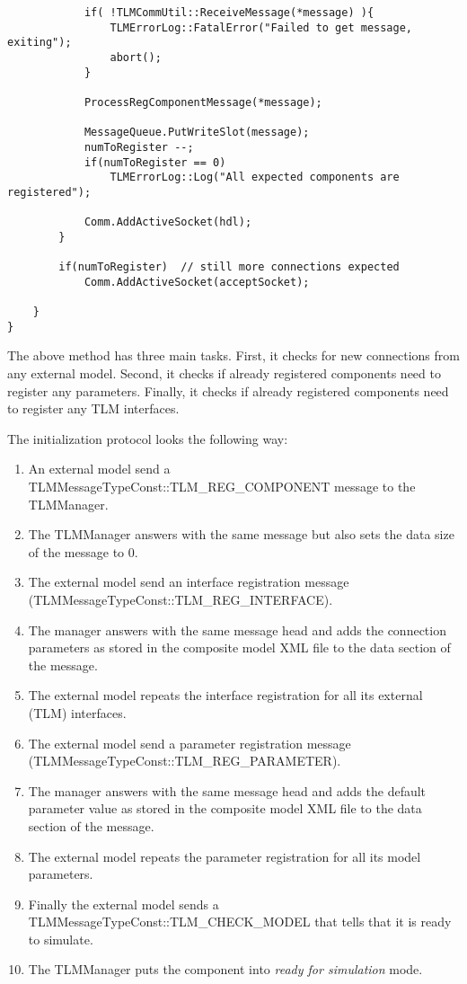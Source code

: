 {\begin{verbatim}
            if( !TLMCommUtil::ReceiveMessage(*message) ){
                TLMErrorLog::FatalError("Failed to get message, exiting");
                abort();
            }

            ProcessRegComponentMessage(*message);

            MessageQueue.PutWriteSlot(message);
            numToRegister --;
            if(numToRegister == 0)
                TLMErrorLog::Log("All expected components are registered");

            Comm.AddActiveSocket(hdl);
        }

        if(numToRegister)  // still more connections expected
            Comm.AddActiveSocket(acceptSocket);

    }
}
\end{verbatim}
}
\noindent The above method has three main tasks.
First, it checks for new connections from any external model. 
Second, it checks if already registered components need to register any parameters.
Finally, it checks if already registered components need to register any TLM interfaces.

The initialization protocol looks the following way:
\begin{enumerate}
\item An external model send a TLMMessageTypeConst::TLM\_REG\_COMPONENT message to the TLMManager.
\item The TLMManager answers with the same message but also sets the data size of the message to 0.
\item The external model send an interface registration message (TLMMessageTypeConst::TLM\_REG\_INTERFACE).
\item The manager answers with the same message head and adds the connection parameters as stored in the composite model XML file to the data section of the message.
\item The external model repeats the interface registration for all its external (TLM) interfaces.
\item The external model send a parameter registration message (TLMMessageTypeConst::TLM\_REG\_PARAMETER).
\item The manager answers with the same message head and adds the default parameter value as stored in the composite model XML file to the data section of the message.
\item The external model repeats the parameter registration for all its model parameters.
\item Finally the external model sends a TLMMessageTypeConst::TLM\_CHECK\_MODEL that tells that it is ready to simulate.
\item The TLMManager puts the component into {\em ready for simulation} mode.
\end{enumerate}

